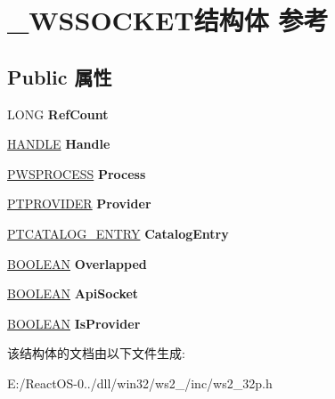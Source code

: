 \hypertarget{struct___w_s_s_o_c_k_e_t}{}\section{\+\_\+\+W\+S\+S\+O\+C\+K\+E\+T结构体 参考}
\label{struct___w_s_s_o_c_k_e_t}
\subsection*{Public 属性}
\begin{DoxyCompactItemize}
\item 
\mbox{\label{struct___w_s_s_o_c_k_e_t_a63470e6aa57e3801a3dffea93cc4b653}} 
L\+O\+NG {\bfseries Ref\+Count}
\item 
\mbox{\label{struct___w_s_s_o_c_k_e_t_a52147781f583fdfa12b055478655e61b}} 
\hyperlink{interfacevoid}{H\+A\+N\+D\+LE} {\bfseries Handle}
\item 
\mbox{\label{struct___w_s_s_o_c_k_e_t_a67a94dd3db3b919d6d457eaab5bdb0e6}} 
\hyperlink{struct___w_s_p_r_o_c_e_s_s}{P\+W\+S\+P\+R\+O\+C\+E\+SS} {\bfseries Process}
\item 
\mbox{\label{struct___w_s_s_o_c_k_e_t_a04a2c7fc4966a9124a37dd1ea3a6e16d}} 
\hyperlink{struct___t_p_r_o_v_i_d_e_r}{P\+T\+P\+R\+O\+V\+I\+D\+ER} {\bfseries Provider}
\item 
\mbox{\label{struct___w_s_s_o_c_k_e_t_a8551c666f3e5c61f97108e186866ea8f}} 
\hyperlink{struct___t_c_a_t_a_l_o_g___e_n_t_r_y}{P\+T\+C\+A\+T\+A\+L\+O\+G\+\_\+\+E\+N\+T\+RY} {\bfseries Catalog\+Entry}
\item 
\mbox{\label{struct___w_s_s_o_c_k_e_t_a823cdb9a1970c584972bd3c1194c1cc6}} 
\hyperlink{_processor_bind_8h_a112e3146cb38b6ee95e64d85842e380a}{B\+O\+O\+L\+E\+AN} {\bfseries Overlapped}
\item 
\mbox{\label{struct___w_s_s_o_c_k_e_t_afc3a988f07a42594eeb77f58fc9cd540}} 
\hyperlink{_processor_bind_8h_a112e3146cb38b6ee95e64d85842e380a}{B\+O\+O\+L\+E\+AN} {\bfseries Api\+Socket}
\item 
\mbox{\label{struct___w_s_s_o_c_k_e_t_a4db7f857de8ddb6c218069e6f5c7a089}} 
\hyperlink{_processor_bind_8h_a112e3146cb38b6ee95e64d85842e380a}{B\+O\+O\+L\+E\+AN} {\bfseries Is\+Provider}
\end{DoxyCompactItemize}


该结构体的文档由以下文件生成\+:\begin{DoxyCompactItemize}
\item 
E\+:/\+React\+O\+S-\/0../dll/win32/ws2\+\_/inc/ws2\+\_\+32p.\+h\end{DoxyCompactItemize}
